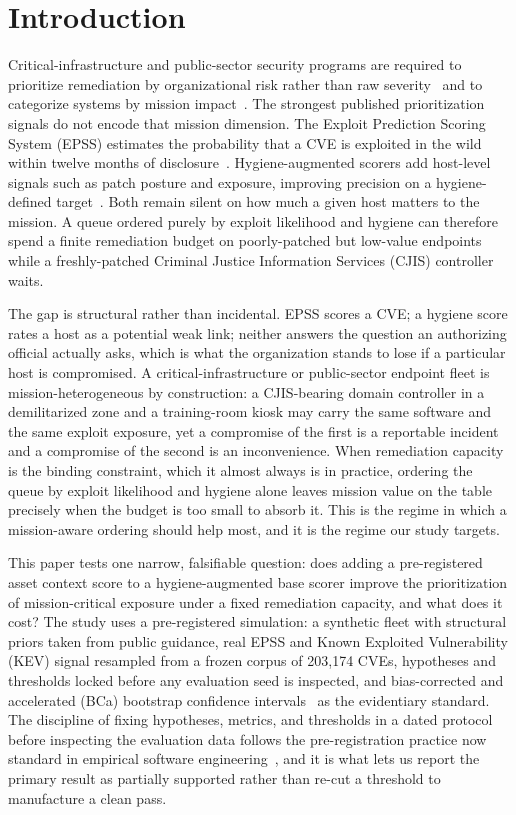 \section{Introduction}

Critical-infrastructure and public-sector security programs are required to prioritize
remediation by organizational risk rather than raw severity~\cite{nist80053} and to categorize
systems by mission impact~\cite{fips199}. The strongest published prioritization signals do not encode that
mission dimension. The Exploit Prediction Scoring System (EPSS) estimates the probability that
a CVE is exploited in the wild within twelve months of disclosure~\cite{jacobs2021epss}.
Hygiene-augmented scorers add host-level signals such as patch posture and exposure, improving
precision on a hygiene-defined target~\cite{paper4hygieneprio}. Both remain silent on how much
a given host matters to the mission. A queue ordered purely by exploit likelihood and hygiene
can therefore spend a finite remediation budget on poorly-patched but low-value endpoints while
a freshly-patched Criminal Justice Information Services (CJIS) controller waits.

The gap is structural rather than incidental. EPSS scores a CVE; a hygiene score rates a host
as a potential weak link; neither answers the question an authorizing official actually asks,
which is what the organization stands to lose if a particular host is compromised. A
critical-infrastructure or public-sector endpoint fleet is mission-heterogeneous by
construction: a CJIS-bearing domain controller in a
demilitarized zone and a training-room kiosk may carry the same software and the same exploit
exposure, yet a compromise of the first is a reportable incident and a compromise of the second
is an inconvenience. When remediation capacity is the binding constraint, which it almost always
is in practice, ordering the queue by exploit likelihood and hygiene alone leaves mission value
on the table precisely when the budget is too small to absorb it. This is the regime in which a
mission-aware ordering should help most, and it is the regime our study targets.

This paper tests one narrow, falsifiable question: does adding a pre-registered asset context
score to a hygiene-augmented base scorer improve the prioritization of mission-critical
exposure under a fixed remediation capacity, and what does it cost? The study uses a
pre-registered simulation: a synthetic fleet with structural priors taken from public
guidance, real EPSS and Known Exploited Vulnerability (KEV) signal resampled from a frozen
corpus of 203{,}174 CVEs, hypotheses and thresholds locked before any evaluation seed is
inspected, and bias-corrected and accelerated (BCa) bootstrap confidence
intervals~\cite{efron1987bca,efron1994introduction} as the evidentiary standard. The discipline
of fixing hypotheses, metrics, and thresholds in a dated protocol before inspecting the
evaluation data follows the pre-registration practice now standard in empirical software
engineering~\cite{wohlin2012experimentation}, and it is what lets us report the primary result
as partially supported rather than re-cut a threshold to manufacture a clean pass.

